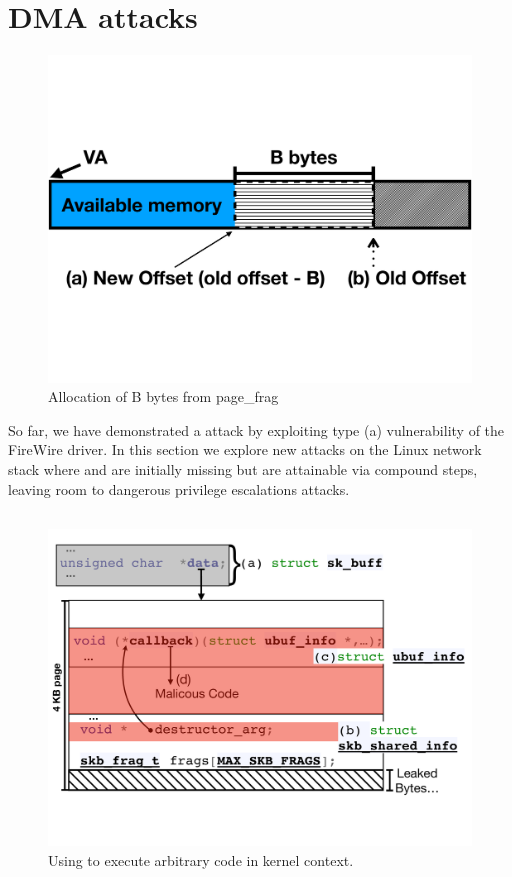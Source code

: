 \section{\Compound{} DMA attacks}\label{sec:linux_net}
\begin{figure}
    \centering
    \includegraphics[width=1\linewidth]{figs/page_frag.pdf}
    \caption{Allocation of B bytes from page\_frag}
    \label{fig:page_frags}
\end{figure}

So far, we have demonstrated a \simple{} attack by exploiting type (a) \subpage{} vulnerability of the FireWire driver. In this section we explore new attacks on the Linux network stack where \means{} and \oportunity{} 
are initially missing but are attainable via compound steps, leaving room to dangerous privilege escalations attacks.

\subsection{\shinfo}
\begin{figure}[t]
    \centering
    \includegraphics[width=\linewidth]{figs/ubuf.pdf}
    \caption{Using \shinfo{} to execute arbitrary code in kernel context.}
    \label{fig:sh_info}
\end{figure}

